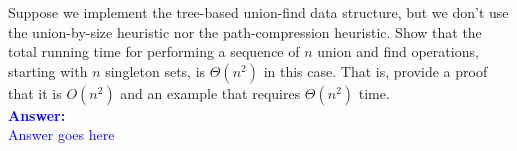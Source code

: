 \item{}
Suppose we implement the tree-based union-find data structure, but we don't use
the union-by-size heuristic nor the path-compression heuristic. Show that the
total running time for performing a sequence of $n$ union and find operations,
starting with $n$ singleton sets, is $\Theta(n^2)$ in this case. That is,
provide a proof that it is $O(n^2)$ and an example that requires $\Theta(n^2)$
time.\\[12pt]
\ifanswers
\textcolor{blue}{
\textbf{Answer:}\\[6pt]
Answer goes here
}
\newpage
\fi
